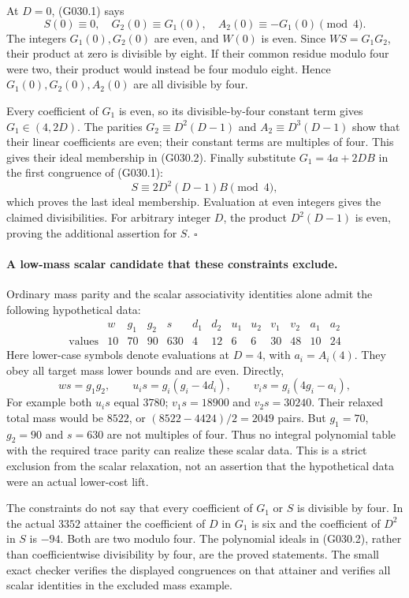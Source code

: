 At $D=0$, (G030.1) says
\[
 S(0)\equiv0,\quad G_2(0)\equiv G_1(0),\quad
 A_2(0)\equiv-G_1(0)\pmod4.
\]
The integers $G_1(0),G_2(0)$ are even, and $W(0)$
is even. Since $WS=G_1G_2$, their product at zero
is divisible by eight. If their common residue
modulo four were two, their product would instead
be four modulo eight. Hence $G_1(0),G_2(0),A_2(0)$
are all divisible by four.

Every coefficient of $G_1$ is even, so its divisible-by-four
constant term gives $G_1\in(4,2D)$. The parities
$G_2\equiv D^2(D-1)$ and
$A_2\equiv D^3(D-1)$ show that their linear
coefficients are even; their constant terms are
multiples of four. This gives their ideal membership
in (G030.2). Finally substitute $G_1=4a+2DB$
in the first congruence of (G030.1):
\[
 S\equiv2D^2(D-1)B\pmod4,
\]
which proves the last ideal membership. Evaluation
at even integers gives the claimed divisibilities.
For arbitrary integer $D$, the product $D^2(D-1)$
is even, proving the additional assertion for $S$.
\hfill$\square$

\paragraph{A low-mass scalar candidate that these constraints exclude.}
Ordinary mass parity and the scalar associativity
identities alone admit the following hypothetical data:
\[
 \begin{array}{c|rrrrrrrrrrrr}
 &w&g_1&g_2&s&d_1&d_2&u_1&u_2&v_1&v_2&a_1&a_2\\\hline
 \text{values}&10&70&90&630&4&12&6&6&30&48&10&24
 \end{array}
\]
Here lower-case symbols denote evaluations at $D=4$,
with $a_i=A_i(4)$. They obey all target mass lower
bounds and are even. Directly,
\[
 ws=g_1g_2,
 \qquad u_i s=g_i(g_i-4d_i),\qquad
 v_i s=g_i(4g_i-a_i),
\]
For example both $u_i s$ equal $3780$;
$v_1s=18900$ and $v_2s=30240$.
Their relaxed total mass would be $8522$, or
$(8522-4424)/2=2049$ pairs. But $g_1=70$, $g_2=90$
and $s=630$ are not multiples of four. Thus no integral
polynomial table with the required trace parity can
realize these scalar data. This is a strict exclusion
from the scalar relaxation, not an assertion that the
hypothetical data were an actual lower-cost lift.

The constraints do not say that every coefficient
of $G_1$ or $S$ is divisible by four. In the actual
$3352$ attainer the coefficient of $D$ in $G_1$
is six and the coefficient of $D^2$ in $S$ is
$-94$. Both are two modulo four. The polynomial
ideals in (G030.2), rather than coefficientwise
divisibility by four, are the proved statements.
The small exact checker verifies the displayed
congruences on that attainer and verifies all scalar
identities in the excluded mass example.


